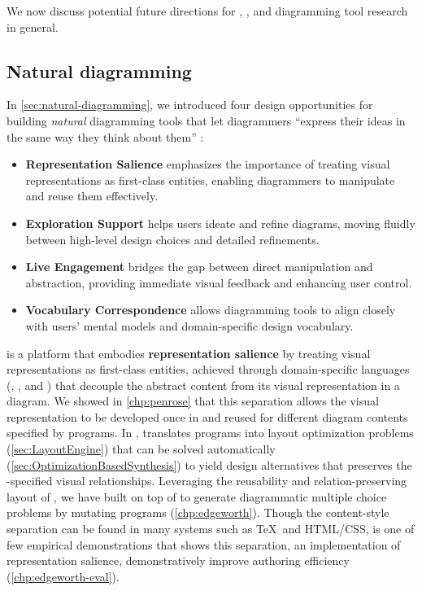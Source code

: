 We now discuss potential future directions for \Penrose, \Edgeworth, and diagramming tool research in general. 

\subsection{Natural diagramming}

In \cref{sec:natural-diagramming}, we introduced four design opportunities for building \emph{natural} diagramming tools that let diagrammers ``express their ideas in the same way they think about them'' \cite{myers_natural_2004}:

\begin{itemize}
  \item \textbf{Representation Salience} emphasizes the importance of treating visual representations as first-class entities, enabling diagrammers to manipulate and reuse them effectively.
  \item \textbf{Exploration Support} helps users ideate and refine diagrams, moving fluidly between high-level design choices and detailed refinements.
  \item \textbf{Live Engagement} bridges the gap between direct manipulation and abstraction, providing immediate visual feedback and enhancing user control.
  \item \textbf{Vocabulary Correspondence} allows diagramming tools to align closely with users' mental models and domain-specific design vocabulary.
\end{itemize}

\Penrose is a platform that embodies \textbf{representation salience} by treating visual representations as first-class entities, achieved through domain-specific languages (\Domain, \Substance, and \Style) that decouple the abstract content from its visual representation in a diagram. We showed in \cref{chp:penrose} that this separation allows the visual representation to be developed once in \Style and reused for different diagram contents specified by \Substance programs. In \Penrose, \Style translates \Substance programs into layout optimization problems (\cref{sec:LayoutEngine}) that can be solved automatically (\cref{sec:OptimizationBasedSynthesis}) to yield design alternatives that preserves the \Style-specified visual relationships. Leveraging the reusability and relation-preserving layout of \Style, we have built \Edgeworth on top of \Penrose to generate diagrammatic multiple choice problems by mutating \Substance programs (\cref{chp:edgeworth}). Though the content-style separation can be found in many systems such as \TeX\ and HTML/CSS, \Edgeworth is one of few empirical demonstrations that shows this separation, an implementation of representation salience, demonstratively improve authoring efficiency (\cref{chp:edgeworth-eval}).

